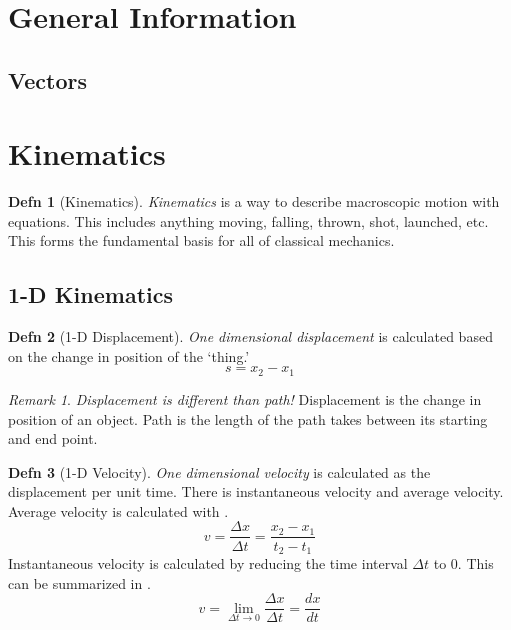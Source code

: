 \documentclass[10pt,letterpaper,final,twoside,notitlepage]{article}
\theoremstyle{plain}
\theoremstyle{definition}
\newtheorem{definition}{Defn}
\theoremstyle{remark}
\newtheorem{remark}{Remark}[definition]
\begin{document}
\tableofcontents
\clearpage
{} %

\section{General Information} \label{sec:General Info}
\subsection{Vectors} \label{subsec:Vectors}

\section{Kinematics} \label{sec:Kinematics}
\begin{definition}[Kinematics]
  \emph{Kinematics} is a way to describe macroscopic motion with equations.
  This includes anything moving, falling, thrown, shot, launched, etc.
  This forms the fundamental basis for all of classical mechanics.
\end{definition}

\subsection{1-D Kinematics} \label{subsec:1D Kinematics}
\begin{definition}[1-D Displacement] \label{def:1D Displacement}
  \emph{One dimensional displacement} is calculated based on the change in position of the `thing.'
  \begin{equation} \label{eq:1D Displacement}
    s = x_{2} - x_{1}
  \end{equation}
  \begin{remark}
    \emph{Displacement is different than path!}
    Displacement is the change in position of an object.
    Path is the length of the path takes between its starting and end point.
  \end{remark}
\end{definition}

\begin{definition}[1-D Velocity] \label{def:1D Velocity}
  \emph{One dimensional velocity} is calculated as the displacement per unit time.
  There is instantaneous velocity and average velocity.
  Average velocity is calculated with .
  \begin{equation} \label{eq:1D Average Velocity}
    v = \frac{\Delta x}{\Delta t} = \frac{x_{2}-x_{1}}{t_{2}-t_{1}}
  \end{equation}
  Instantaneous velocity is calculated by reducing the time interval $\Delta t$ to 0.
  This can be summarized in .
  \begin{equation} \label{eq:1D Instantaneous Velocity}
    v = \lim\limits_{\Delta t \rightarrow 0} \frac{\Delta x}{\Delta t} = \frac{dx}{dt}
  \end{equation}
\end{definition}
\end{document}
